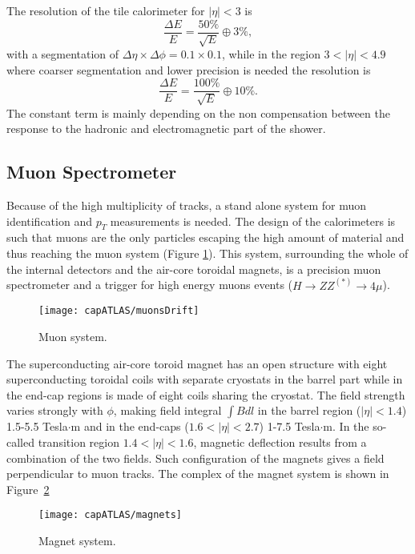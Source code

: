 The resolution of the tile calorimeter for $|\eta|<3$ is
\begin{equation}\label{eq:resolutionTile}
\frac{\Delta E}{E} = \frac{50\%}{\sqrt{E}}\oplus 3\%,
\end{equation} with a segmentation of $\Delta\eta\times\Delta\phi = 0.1\times0.1$, while in the region $3<|\eta|<4.9$ where coarser segmentation and lower precision is needed the resolution is
\begin{equation}\label{eq:resolutionTile2}
\frac{\Delta E}{E} = \frac{100\%}{\sqrt{E}}\oplus 10\%.
\end{equation} The constant term is mainly depending on the non compensation between the response to the hadronic and electromagnetic part of the shower.


\subsection{Muon Spectrometer}
Because of the high multiplicity of tracks, a stand alone system for muon identification and $p_{T}$ measurements is needed. The design of the calorimeters is such that muons are the only particles escaping the high amount of material and thus reaching the muon system (Figure \ref{muonsDrift}). This system, surrounding the whole of the internal detectors and the air-core toroidal magnets, is a precision muon spectrometer and a trigger for high energy muons events ($H\rightarrow ZZ^{(*)}\rightarrow4\mu$).

\begin{figure}[hbt]\begin{center}
\texttt{[image: capATLAS/muonsDrift]}\caption{Muon system.}\label{muonsDrift}
\end{center}\end{figure}

The superconducting air-core toroid magnet has an open structure with eight superconducting toroidal coils with separate cryostats in the barrel part while in the end-cap regions is made of eight coils sharing the cryostat. The field strength varies strongly with $\phi$, making field integral $\int Bdl$ in the barrel region ($|\eta|<1.4$) 1.5-5.5 Tesla$\cdot$m and in the end-caps ($1.6<|\eta|<2.7$) 1-7.5 Tesla$\cdot$m. In the so-called transition region $1.4<|\eta|<1.6$, magnetic deflection results from a combination of the two fields. Such configuration of the magnets gives a field perpendicular to muon tracks. The complex of the magnet system is shown in Figure~\ref{magnets}
\begin{figure}[hbt]\begin{center}
\texttt{[image: capATLAS/magnets]}\caption{Magnet system.}\label{magnets}
\end{center}\end{figure}

